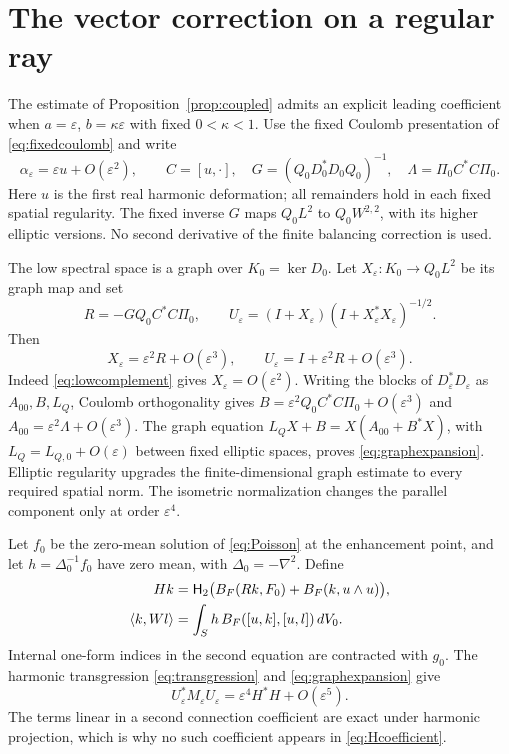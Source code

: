 \section{The vector correction on a regular ray}\label{app:coefficient}

The estimate of Proposition~\ref{prop:coupled} admits an explicit
leading coefficient when $a=\varepsilon$, $b=\kappa\varepsilon$
with fixed $0<\kappa<1$. Use the fixed Coulomb presentation of
\eqref{eq:fixedcoulomb} and write
\[
 \alpha_\varepsilon=\varepsilon u+O(\varepsilon^2),\qquad
 C=[u,\cdot],\quad
 G=(Q_0D_0^*D_0Q_0)^{-1},\quad
 \Lambda=\Pi_0C^*C\Pi_0.
\]
Here $u$ is the first real harmonic deformation; all remainders
hold in each fixed spatial regularity. The fixed inverse $G$
maps $Q_0L^2$ to $Q_0W^{2,2}$, with its higher elliptic versions.
No second derivative of the finite balancing correction is used.

The low spectral space is a graph over $K_0=\ker D_0$.
Let $X_\varepsilon:K_0\to Q_0L^2$ be its graph map and set
\begin{equation}\label{eq:graphcoefficient}
 R=-GQ_0C^*C\Pi_0,\qquad
 U_\varepsilon=(I+X_\varepsilon)
              (I+X_\varepsilon^*X_\varepsilon)^{-1/2}.
\end{equation}
Then
\begin{equation}\label{eq:graphexpansion}
 X_\varepsilon=\varepsilon^2R+O(\varepsilon^3),\qquad
 U_\varepsilon=I+\varepsilon^2R+O(\varepsilon^3).
\end{equation}
Indeed \eqref{eq:lowcomplement} gives $X_\varepsilon=O(\varepsilon^2)$.
Writing the blocks of $D_\varepsilon^*D_\varepsilon$ as
$A_{00},B,L_Q$, Coulomb orthogonality gives
$B=\varepsilon^2Q_0C^*C\Pi_0+O(\varepsilon^3)$ and
$A_{00}=\varepsilon^2\Lambda+O(\varepsilon^3)$.
The graph equation
$L_QX+B=X(A_{00}+B^*X)$, with
$L_Q=L_{Q,0}+O(\varepsilon)$ between fixed elliptic spaces,
proves \eqref{eq:graphexpansion}. Elliptic regularity upgrades
the finite-dimensional graph estimate to every required spatial norm.
The isometric normalization changes the parallel component only
at order $\varepsilon^4$.

Let $f_0$ be the zero-mean solution of \eqref{eq:Poisson} at
the enhancement point, and let $h=\Delta_0^{-1}f_0$ have zero
mean, with $\Delta_0=-\nabla^2$. Define
\begin{align}
 Hk&=\mathsf H_2\bigl(B_F(Rk,F_0)+B_F(k,u\wedge u)\bigr),
 \label{eq:Hcoefficient}\\
 \langle k,Wl\rangle
   &=\int_S h\,B_F([u,k],[u,l])\,dV_0 .
 \label{eq:Wcoefficient}
\end{align}
Internal one-form indices in the second equation are contracted
with $g_0$. The harmonic transgression \eqref{eq:transgression}
and \eqref{eq:graphexpansion} give
\begin{equation}\label{eq:masscoefficient}
 U_\varepsilon^*M_\varepsilon U_\varepsilon
      =\varepsilon^4H^*H+O(\varepsilon^5).
\end{equation}
The terms linear in a second connection coefficient are exact
under harmonic projection, which is why no such coefficient
appears in \eqref{eq:Hcoefficient}.


